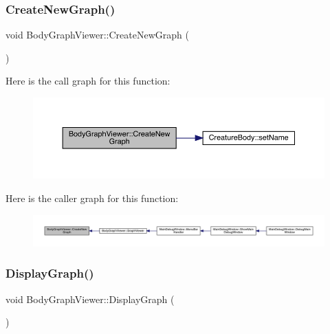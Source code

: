 \subsubsection{\texorpdfstring{Create\+New\+Graph()}{CreateNewGraph()}}
{\footnotesize\ttfamily void Body\+Graph\+Viewer\+::\+Create\+New\+Graph (\begin{DoxyParamCaption}{ }\end{DoxyParamCaption})}

Here is the call graph for this function\+:
\nopagebreak
\begin{figure}[H]
\begin{center}
\leavevmode
\includegraphics[width=350pt]{df/d9e/namespace_body_graph_viewer_ae8fa18b34d0a6c141c3257cdb7899f38_cgraph}
\end{center}
\end{figure}
Here is the caller graph for this function\+:
\nopagebreak
\begin{figure}[H]
\begin{center}
\leavevmode
\includegraphics[width=350pt]{df/d9e/namespace_body_graph_viewer_ae8fa18b34d0a6c141c3257cdb7899f38_icgraph}
\end{center}
\end{figure}
\mbox{\label{namespace_body_graph_viewer_a4f4bee772e1d2c1133111866dd88f140}} 
\subsubsection{\texorpdfstring{Display\+Graph()}{DisplayGraph()}}
{\footnotesize\ttfamily void Body\+Graph\+Viewer\+::\+Display\+Graph (\begin{DoxyParamCaption}{ }\end{DoxyParamCaption})}

